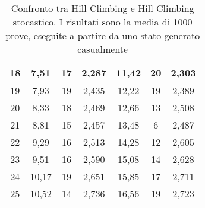 \begin{table}[]
{\begin{tabular}{|c|c|c|c|c|c|c|}
18 & 7,51        & 17          & 2,287           & 11,42        & 20           & 2,303           \\ \hline
19 & 7,93        & 19          & 2,435           & 12,22        & 19           & 2,389           \\ \hline
20 & 8,33        & 18          & 2,469           & 12,66        & 13           & 2,508           \\ \hline
21 & 8,81        & 15          & 2,457           & 13,48        & 6            & 2,487           \\ \hline
22 & 9,29        & 16          & 2,513           & 14,28        & 12           & 2,605           \\ \hline
23 & 9,51        & 16          & 2,590           & 15,08        & 14           & 2,628           \\ \hline
24 & 10,17       & 19          & 2,651           & 15,85        & 17           & 2,711           \\ \hline
25 & 10,52       & 14          & 2,736           & 16,56        & 19           & 2,723           \\ \hline
\end{tabular}
}
\caption{Confronto tra Hill Climbing e Hill Climbing stocastico. I risultati sono la media di 1000 prove, eseguite a partire da uno stato generato casualmente}
\label{table:stocastico}
\end{table}